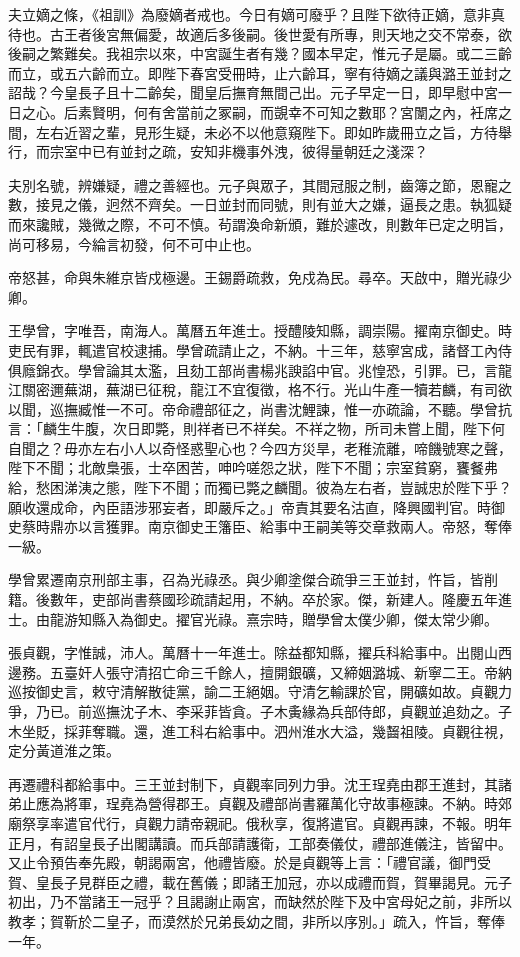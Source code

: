 \begin{pinyinscope}
夫立嫡之條，《祖訓》為廢嫡者戒也。今日有嫡可廢乎？且陛下欲待正嫡，意非真待也。古王者後宮無偏愛，故適后多後嗣。後世愛有所專，則天地之交不常泰，欲後嗣之繁難矣。我祖宗以來，中宮誕生者有幾？國本早定，惟元子是屬。或二三齡而立，或五六齡而立。即陛下春宮受冊時，止六齡耳，寧有待嫡之議與潞王並封之詔哉？今皇長子且十二齡矣，聞皇后撫育無間己出。元子早定一日，即早慰中宮一日之心。后素賢明，何有舍當前之冢嗣，而覬幸不可知之數耶？宮闈之內，衽席之間，左右近習之輩，見形生疑，未必不以他意窺陛下。即如昨歲冊立之旨，方待舉行，而宗室中已有並封之疏，安知非機事外洩，彼得量朝廷之淺深？

夫別名號，辨嫌疑，禮之善經也。元子與眾子，其間冠服之制，齒簿之節，恩寵之數，接見之儀，迥然不齊矣。一日並封而同號，則有並大之嫌，逼長之患。執狐疑而來讒賊，幾微之際，不可不慎。茍謂渙命新頒，難於遽改，則數年已定之明旨，尚可移易，今綸言初發，何不可中止也。

帝怒甚，命與朱維京皆戍極邊。王錫爵疏救，免戍為民。尋卒。天啟中，贈光祿少卿。

王學曾，字唯吾，南海人。萬曆五年進士。授醴陵知縣，調崇陽。擢南京御史。時吏民有罪，輒遣官校逮捕。學曾疏請止之，不納。十三年，慈寧宮成，諸督工內侍俱廕錦衣。學曾論其太濫，且劾工部尚書楊兆諛諂中官。兆惶恐，引罪。已，言龍江關密邇蕪湖，蕪湖已征稅，龍江不宜復徵，格不行。光山牛產一犢若麟，有司欲以聞，巡撫臧惟一不可。帝命禮部征之，尚書沈鯉諫，惟一亦疏論，不聽。學曾抗言：「麟生牛腹，次日即斃，則祥者已不祥矣。不祥之物，所司未嘗上聞，陛下何自聞之？毋亦左右小人以奇怪惑聖心也？今四方災旱，老稚流離，啼饑號寒之聲，陛下不聞；北敵梟張，士卒困苦，呻吟嗟怨之狀，陛下不聞；宗室貧窮，饔餐弗給，愁困涕洟之態，陛下不聞；而獨已斃之麟聞。彼為左右者，豈誠忠於陛下乎？願收還成命，內臣語涉邪妄者，即嚴斥之。」帝責其要名沽直，降興國判官。時御史蔡時鼎亦以言獲罪。南京御史王籓臣、給事中王嗣美等交章救兩人。帝怒，奪俸一級。

學曾累遷南京刑部主事，召為光祿丞。與少卿塗傑合疏爭三王並封，忤旨，皆削籍。後數年，吏部尚書蔡國珍疏請起用，不納。卒於家。傑，新建人。隆慶五年進士。由龍游知縣入為御史。擢官光祿。熹宗時，贈學曾太僕少卿，傑太常少卿。

張貞觀，字惟誠，沛人。萬曆十一年進士。除益都知縣，擢兵科給事中。出閱山西邊務。五臺奸人張守清招亡命三千餘人，擅開銀礦，又締姻潞城、新寧二王。帝納巡按御史言，敕守清解散徒黨，諭二王絕姻。守清乞輸課於官，開礦如故。貞觀力爭，乃已。前巡撫沈子木、李采菲皆貪。子木夤緣為兵部侍郎，貞觀並追劾之。子木坐貶，採菲奪職。還，進工科右給事中。泗州淮水大溢，幾齧祖陵。貞觀往視，定分黃道淮之策。

再遷禮科都給事中。三王並封制下，貞觀率同列力爭。沈王珵堯由郡王進封，其諸弟止應為將軍，珵堯為營得郡王。貞觀及禮部尚書羅萬化守故事極諫。不納。時郊廟祭享率遣官代行，貞觀力請帝親祀。俄秋享，復將遣官。貞觀再諫，不報。明年正月，有詔皇長子出閣講讀。而兵部請護衛，工部奏儀仗，禮部進儀注，皆留中。又止令預告奉先殿，朝謁兩宮，他禮皆廢。於是貞觀等上言：「禮官議，御門受賀、皇長子見群臣之禮，載在舊儀；即諸王加冠，亦以成禮而賀，賀畢謁見。元子初出，乃不當諸王一冠乎？且謁謝止兩宮，而缺然於陛下及中宮母妃之前，非所以教孝；賀靳於二皇子，而漠然於兄弟長幼之間，非所以序別。」疏入，忤旨，奪俸一年。


\end{pinyinscope}
